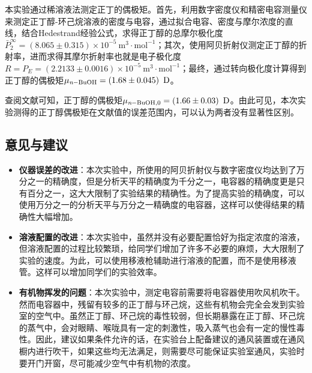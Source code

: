 \documentclass[cn,hazy,pku,12pt,normal,math=newtx,cite=super]{elegantnote}
\begin{document}
本实验通过稀溶液法测定正丁的偶极矩。首先，利用数字密度仪和精密电容测量仪来测定正丁醇-环己烷溶液的密度与电容，通过拟合电容、密度与摩尔浓度的直线，结合Hedestrand经验公式，求得正丁醇的总摩尔极化度$\bar{P}_2^\infty = (8.065\pm 0.315) \times 10^{-5}\mathrm{~m^3\cdot mol^{-1}}$；其次，使用阿贝折射仪测定正丁醇的折射率，进而求得其摩尔折射率也就是电子极化度$R=P_E=(2.2133  \pm 0.0016 )\times 10^{-5}\mathrm{~ m^3\cdot mol^{-1}}$；最终，通过转向极化度计算得到正丁醇的偶极矩$\mu_{\ce{\textit{n}-BuOH}}=\left (1.68 \pm 0.045 \right )\mathrm{~D} $。

查阅文献\cite{haynes2016crc}可知，正丁醇的偶极矩$\mu_{\ce{\textit{n}-BuOH},0}=\left (1.66 \pm 0.03 \right )\mathrm{~D} $。由此可见，本次实验测得的正丁醇偶极矩在文献值的误差范围内，可以认为两者没有显著性区别。


\subsection{意见与建议}

\begin{itemize}
    \item \textbf{仪器误差的改进}：本次实验中，所使用的阿贝折射仪与数字密度仪均达到了万分之一的精确度，但是分析天平的精确度为千分之一，电容器的精确度更是只有百分之一，这大大限制了实验结果的精确性。为了提高实验的精确度，可以使用万分之一的分析天平与万分之一精确度的电容器，这样可以使得结果的精确性大幅增加。
    \item \textbf{溶液配置的改进}：本次实验中，虽然并没有必要配置恰好为指定浓度的溶液，但溶液配置的过程比较繁琐，给同学们增加了许多不必要的麻烦，大大限制了实验的速度。为此，可以使用移液枪辅助进行溶液的配置，而不是使用移液管。这样可以增加同学们的实验效率。
    \item \textbf{有机物挥发的问题}：本次实验中，测定电容前需要将电容器使用吹风机吹干。然而电容器中，残留有较多的正丁醇与环己烷，这些有机物会完全会发到实验室的空气中。虽然正丁醇、环己烷的毒性较弱，但长期暴露在正丁醇、环己烷的蒸气中，会对眼睛、喉咙具有一定的刺激性，吸入蒸气也会有一定的慢性毒性。因此，建议如果条件允许的话，在实验台上配备建议的通风装置或在通风橱内进行吹干，如果这些均无法满足，则需要尽可能保证实验室通风，实验时要开门开窗，尽可能减少空气中有机物的浓度。
\end{itemize}


\end{document}
